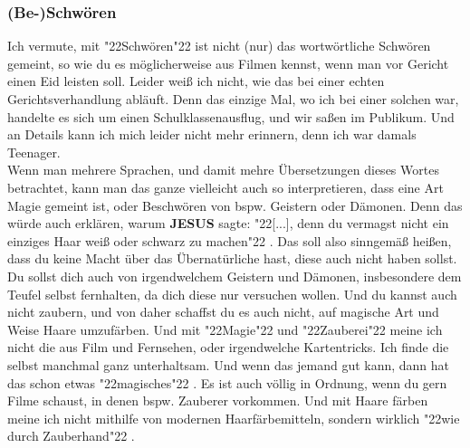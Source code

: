 \documentclass[12pt,a5paper]{article}
\newcommand{\Jesus}[0]{\textbf{JESUS}}
\newcommand{\q}[1]{\char"22{#1}\char"22 }
\begin{document}
	\subsubsection{(Be-)Schw\"oren}
		Ich vermute,
		mit \q{Schw\"oren} ist nicht (nur) das wortw\"ortliche Schw\"oren gemeint,
		so wie du es m\"oglicherweise aus Filmen kennst,
		wenn man vor Gericht einen Eid leisten soll.
		Leider wei{\ss} ich nicht,
		wie das bei einer echten Gerichtsverhandlung abl\"auft.
		Denn das einzige Mal,
		wo ich bei einer solchen war,
		handelte es sich um einen Schulklassenausflug,
		und wir sa{\ss}en im Publikum.
		Und an Details kann ich mich leider nicht mehr erinnern,
		denn ich war damals Teenager.
		\\
		Wenn man mehrere Sprachen,
		und damit mehre \"Ubersetzungen dieses Wortes betrachtet,
		kann man das ganze vielleicht auch so interpretieren,
		dass eine Art Magie gemeint ist,
		oder Beschw\"oren von bspw. Geistern oder D\"amonen.
		Denn das w\"urde auch erkl\"aren,
		warum {\Jesus} sagte:
		\q{[...],
		denn du vermagst nicht ein einziges Haar wei{\ss} oder schwarz zu machen}.
		Das soll also sinngem\"a{\ss} hei{\ss}en,
		dass du keine Macht \"uber das \"Ubernat\"urliche hast,
		diese auch nicht haben sollst.
		Du sollst dich auch von irgendwelchem Geistern und D\"amonen,
		insbesondere dem Teufel selbst fernhalten,
		da dich diese nur versuchen wollen.
		Und du kannst auch nicht zaubern,
		und von daher schaffst du es auch nicht,
		auf magische Art und Weise Haare umzuf\"arben.
		Und mit \q{Magie} und \q{Zauberei} meine ich nicht die aus Film und Fernsehen,
		oder irgendwelche Kartentricks.
		Ich finde die selbst manchmal ganz unterhaltsam.
		Und wenn das jemand gut kann,
		dann hat das schon etwas \q{magisches}.
		Es ist auch v\"ollig in Ordnung,
		wenn du gern Filme schaust,
		in denen bspw. Zauberer vorkommen.
		Und mit Haare f\"arben meine ich nicht mithilfe von modernen Haarf\"arbemitteln,
		sondern wirklich \q{wie durch Zauberhand}.
		
\end{document}
